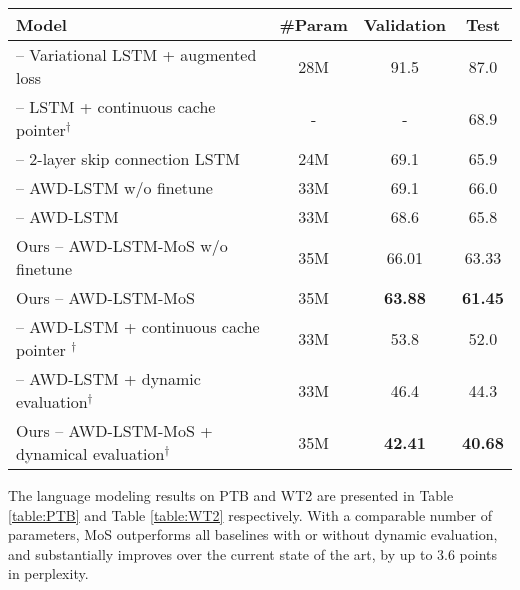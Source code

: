 \begin{table*}[t]%
	\small
	\centering
	\begin{tabular}{l|ccc}
		\toprule
		\bf Model & \bf \#Param & \bf Validation &  \bf Test \\
		\midrule
		\citet{inan2016tying} -- Variational LSTM  + augmented loss & 28M & 91.5 & 87.0 \\
		\citet{grave2016improving} -- LSTM + continuous cache pointer$^\dagger$ & - & - & 68.9 \\
		\citet{melis2017state} -- 2-layer skip connection LSTM & 24M & 69.1 & 65.9 \\
		\midrule
		\citet{merity2017regularizing} -- AWD-LSTM w/o finetune & 33M & 69.1 & 66.0 \\
		\citet{merity2017regularizing} -- AWD-LSTM & 33M & 68.6 & 65.8 \\
		Ours -- AWD-LSTM-MoS w/o finetune & 35M & 66.01 & 63.33 \\
		Ours -- AWD-LSTM-MoS & 35M & \textbf{63.88} & \textbf{61.45} \\
		\midrule
		\citet{merity2017regularizing} -- AWD-LSTM + continuous cache pointer $^\dagger$& 33M & 53.8 & 52.0 \\
		\citet{krause2017dynamic} -- AWD-LSTM + dynamic evaluation$^\dagger$ & 33M & 46.4 & 44.3 \\
		Ours -- AWD-LSTM-MoS + dynamical evaluation$^\dagger$ & 35M & \textbf{42.41} & \textbf{40.68} \\
		\bottomrule
	\end{tabular}
	\caption{\small 
		Single model perplexity over WikiText-2. Baseline results are obtained from \citet{merity2017regularizing} and \citet{krause2017dynamic}. $\dagger$ indicates using dynamic evaluation.
	}
	\label{table:WT2}
	\vspace{-1.5em}
\end{table*}
The language modeling results on PTB and WT2 are presented in Table \ref{table:PTB} and Table \ref{table:WT2} respectively. With a comparable number of parameters, MoS outperforms all baselines with or without dynamic evaluation, and substantially improves over the current state of the art, by up to 3.6 points in perplexity. 

